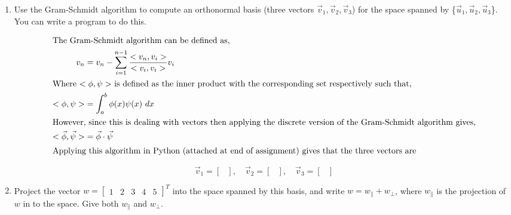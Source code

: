 \begin{enumerate}[label=\alph*., start = 1]
    \item Use the Gram-Schmidt algorithm to compute an orthonormal basis (three vectors $\vec{v}_1, \vec{v}_2, \vec{v}_3$) for the space spanned by \{$\vec{u}_1,\vec{u}_2,\vec{u}_3$\}. You can write a program to do this.
    
    \begin{align*}
        \shortintertext{The Gram-Schmidt algorithm can be defined as,}
        v_n & = v_n -\sum_{i=1}^{n-1} \frac{<v_n, v_i>}{<v_i, v_i>}v_i\\
        \shortintertext{Where $<\phi,\psi>$ is defined as the inner product with the corresponding set respectively such that,}
        <\phi, \psi> & = \int_a^b \phi(x)\psi(x)\ dx\\
        \shortintertext{However, since this is dealing with vectors then applying the discrete version of the Gram-Schmidt algorithm gives,}
        <\vec{\phi}, \vec{\psi}> & = \vec{\phi} \cdot \vec{\psi}\\
        \shortintertext{Applying this algorithm in Python (attached at end of assignment) gives that the three vectors are}
    \end{align*}

    \vspace{-0.2in}
    \begin{fminipage}{0.7\linewidth}
        \begin{equation*}
            \vec{v}_1 = \begin{bmatrix}  \end{bmatrix},\quad  \vec{v}_2 = \begin{bmatrix}  \end{bmatrix},\quad \vec{v}_3 = \begin{bmatrix}  \end{bmatrix}
        \end{equation*}
    \end{fminipage}

    \pagebreak
    \item Project the vector $w= \begin{bmatrix}1 & 2 & 3 & 4 & 5\end{bmatrix}^T$ into the space spanned by this basis, and write \newline $w=w_\parallel+w_\perp$, where $w_\parallel$ is the projection of $w$ in to the space.  Give both $w_\parallel$ and $w_\perp$.


\end{enumerate}
